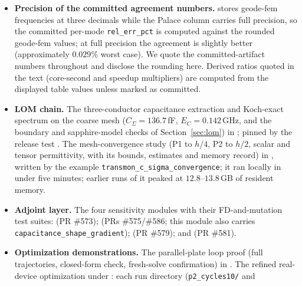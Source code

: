 \documentclass{anvil-paper}
\begin{document}
\begin{itemize}
    source reading of Palace's port operator and search window, the
    port-voltage probe and the planned rank-1 formulation are in
    ; its probe
    is scratch source that the build does not compile.
  \item \textbf{Precision of the committed agreement numbers.}
     stores geode-fem
    frequencies at three decimals while the Palace column carries full
    precision, so the committed per-mode \texttt{rel\_err\_pct} is
    computed against the rounded geode-fem values; at full precision the
    agreement is slightly better (approximately $0.029\%$ worst case).
    We quote the committed-artifact numbers throughout and disclose the
    rounding here. Derived ratios quoted in the text (core-second and
    speedup multipliers) are computed from the displayed table values
    unless marked as committed.
  \item \textbf{LOM chain.} The three-conductor capacitance extraction
    and Koch-exact spectrum on the coarse mesh ($C_\Sigma = 136.7$\,fF,
    $E_C = 0.142$\,GHz, and the boundary and sapphire-model checks of
    Section~\ref{sec:lom}) in
    ; pinned by the
    release test .
    The mesh-convergence study (P1 to $h/4$, P2 to $h/2$, scalar and
    tensor permittivity, with its bounds, estimates and memory record)
    in ,
    written by the example \texttt{transmon\_c\_sigma\_convergence}; it
    ran locally in under five minutes; earlier runs of it peaked at
    $12.8$--$13.8$\,GB of resident memory.
  \item \textbf{Adjoint layer.} The four sensitivity modules with their
    FD-and-mutation test suites:
     (PR \#573);
     (PRs \#575/\#586; this module
    also carries \texttt{capacitance\_shape\_gradient});
     (PR \#579); and
     (PR \#581).
  \item \textbf{Optimization demonstrations.} The parallel-plate loop
    proof (full trajectories, closed-form check, fresh-solve
    confirmation) in .
    The refined real-device optimization under
    : each run
    directory (\texttt{p2\_cycles10/} and

\end{itemize}
\end{document}
